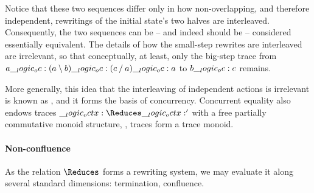 Notice that these two sequences differ only in how non-overlapping, and therefore independent, rewritings of the initial state's two halves are interleaved.
Consequently, the two sequences can be -- and indeed should be -- considered essentially equivalent.
The details of how the small-step rewrites are interleaved are irrelevant, so that
conceptually, at least, only the big-step trace from $a \__logic_oc: (a \mathbin { \setminus } b) \__logic_oc: (c \mathbin { / } a) \__logic_oc: a$ to $b \__logic_oc: c$ remains.

More generally, this idea that the interleaving of independent actions is irrelevant is known as \autocite{Watkins+:CMU02}, and it forms the basis of concurrency.\autocite{??}
Concurrent equality also endows traces $\octx \Reduces \octx'$ with a free partially commutative monoid structure, \ie, traces form a trace monoid.








\clearpage

\paragraph*{Non-confluence}

As the relation $\Reduces$ forms a rewriting system, we may evaluate it along several standard dimensions: termination, confluence.


